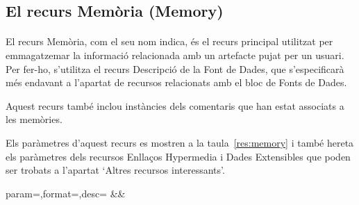 \subsection{El recurs Memòria (Memory)}

    \paragraph{}
    El recurs Memòria, com el seu nom indica, és el recurs principal utilitzat per emmagatzemar la informació relacionada amb un artefacte pujat per un usuari. Per fer-ho, s'utilitza el recurs Descripció de la Font de Dades, que s'especificarà més endavant a l'apartat de recursos relacionats amb el bloc de Fonts de Dades.

    Aquest recurs també inclou instàncies dels comentaris que han estat associats a les memòries.

    Els paràmetres d'aquest recurs es mostren a la taula~\ref{res:memory} i també hereta els paràmetres dels recursos Enllaços Hypermedia i Dades Extensibles que poden ser trobats a l'apartat `Altres recursos interessants'.

    \begin{center}
             {param=\param,format=\format,desc=\desc}
             {\param&\format&\desc}
     \end{center}
